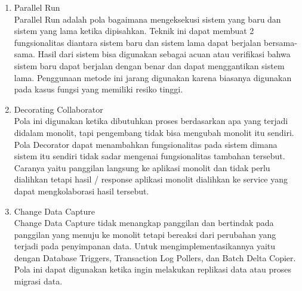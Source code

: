 \begin{enumerate}[leftmargin=1.3cm]
	\item Parallel Run\\
		Parallel Run adalah pola bagaimana mengeksekusi sistem yang baru dan sistem yang lama ketika dipisahkan. Teknik ini dapat membuat 2 fungsionalitas diantara sistem baru dan sistem lama dapat berjalan bersama-sama. Hasil dari sistem bisa digunakan sebagai acuan atau verifikasi bahwa sistem baru dapat berjalan dengan benar dan dapat menggantikan sistem lama. Penggunaan metode ini jarang digunakan karena biasanya digunakan pada kasus fungsi yang memiliki resiko tinggi.
	\item Decorating Collaborator\\
		Pola ini digunakan ketika dibutuhkan proses berdasarkan apa yang terjadi didalam monolit, tapi pengembang tidak bisa mengubah monolit itu sendiri. Pola Decorator dapat menambahkan fungsionalitas pada sistem dimana sistem itu sendiri tidak sadar mengenai fungsionalitas tambahan tersebut. Caranya yaitu panggilan langsung ke aplikasi monolit dan tidak perlu dialihkan tetapi hasil / response aplikasi monolit dialihkan ke service yang dapat mengkolaborasi hasil tersebut.
	\item Change Data Capture\\
		Change Data Capture tidak menangkap panggilan dan bertindak pada panggilan yang menuju ke monolit tetapi bereaksi dari perubahan yang terjadi pada penyimpanan data. Untuk mengimplementasikannya yaitu dengan Database Triggers, Transaction Log Pollers, dan Batch Delta Copier. Pola ini dapat digunakan ketika ingin melakukan replikasi data atau proses migrasi data.
\end{enumerate}	

